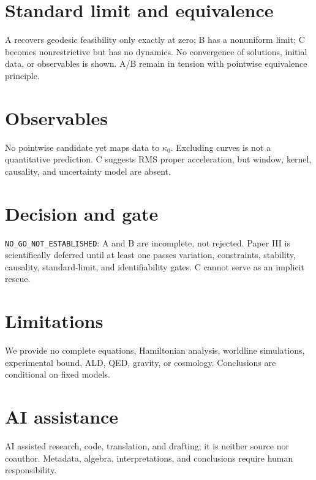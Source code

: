 \documentclass[11pt,a4paper]{article}
\begin{document}
\section{Standard limit and equivalence}\label{sec:p2-limits}
A recovers geodesic feasibility only exactly at zero; B has a nonuniform limit; C becomes nonrestrictive but has no dynamics. No convergence of solutions, initial data, or observables is shown. A/B remain in tension with pointwise equivalence principle.

\section{Observables}\label{sec:p2-observables}
No pointwise candidate yet maps data to $\kappa_0$. Excluding curves is not a quantitative prediction. C suggests RMS proper acceleration, but window, kernel, causality, and uncertainty model are absent.

\section{Decision and gate}\label{sec:p2-decision}
\texttt{NO\_GO\_NOT\_ESTABLISHED}: A and B are incomplete, not rejected. Paper III is scientifically deferred until at least one passes variation, constraints, stability, causality, standard-limit, and identifiability gates. C cannot serve as an implicit rescue.

\section{Limitations}\label{sec:p2-limitations}
We provide no complete equations, Hamiltonian analysis, worldline simulations, experimental bound, ALD, QED, gravity, or cosmology. Conclusions are conditional on fixed models.

\section{AI assistance}\label{sec:p2-ai}
AI assisted research, code, translation, and drafting; it is neither source nor coauthor. Metadata, algebra, interpretations, and conclusions require human responsibility.



\end{document}
